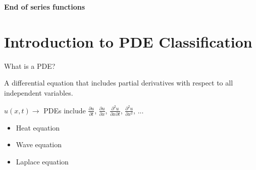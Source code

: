 \documentclass{article}
\begin{document}
\textbf{End of series functions}

\section{Introduction to PDE Classification}

What is a PDE?

A differential equation that includes partial derivatives with respect to all independent variables. 

$u(x,t) \longrightarrow$ PDEs include $\frac{\partial u}{\partial t}$, $\frac{\partial u}{\partial x}$, $\frac{\partial^2 u}{\partial x \partial t}$, $\frac{\partial^2 u}{\partial x^2}$, ...

\begin{itemize}
    \item Heat equation
    \item Wave equation
    \item Laplace equation
\end{itemize}
\end{document}
